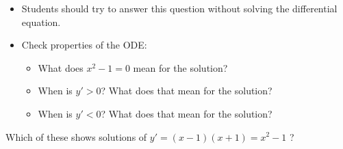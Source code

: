 \begin{annotation}
\begin{goals}
	\begin{itemize}
		\item Students should try to answer this question without solving the differential equation.
		\item Check properties of the ODE:
		\begin{itemize}
			\item What does $x^2-1=0$ mean for the solution?
			\item When is $y'>0$? What does that mean for the solution?
			\item When is $y'<0$? What does that mean for the solution?
		\end{itemize}
	\end{itemize}
\end{goals}	
\end{annotation}

\question

Which of these shows solutions of $y' = (x-1)(x+1) = x^2 - 1$ ?

\newlength{\len}


\def\modeightA{
\begin{tikzpicture}[scale=0.65,yscale=0.8]
    \begin{scope}
	    \clip (-3,-3) rectangle (3,3);
		\foreach \k in {-9,-7, ..., 31} {
	      \draw[samples=50,domain=-3:3,variable=\x,color=gray!80!black] plot ({\x},{(\k-3*(\x*\x))/2});
	    }
    \end{scope}
    \draw[thick] (-3,-3) -- (-3,3);
    \draw[thick] (-3,-3) -- (3,-3);
    \foreach \k in {-3,-2, ..., 3} {
      \draw ({\k,-3}) node[below] {\tiny $\k$};
      \draw ({-3,\k}) node[left] {\tiny $\k$};
    }
\end{tikzpicture}
}

